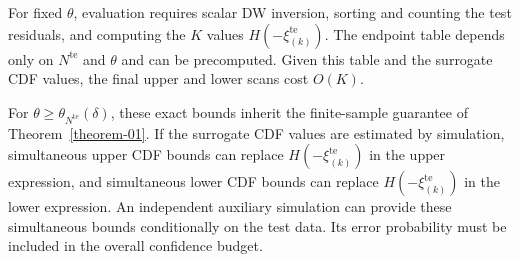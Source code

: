 \documentclass[review,11pt,3p,authoryear,nopreprintline]{elsarticle}
\begin{document}
For fixed $\theta$, evaluation requires scalar DW inversion, sorting and counting the test residuals, and computing the $K$ values $H\left(-\xi_{(k)}^{\mathrm{te}}\right)$. The endpoint table depends only on $N^{\mathrm{te}}$ and $\theta$ and can be precomputed. Given this table and the surrogate CDF values, the final upper and lower scans cost $O(K)$.

For $\theta\ge\theta_{N^{\mathrm{te}}}(\delta)$, these exact bounds inherit the finite-sample guarantee of Theorem~\ref{theorem-01}. If the surrogate CDF values are estimated by simulation, simultaneous upper CDF bounds can replace $H\left(-\xi_{(k)}^{\mathrm{te}}\right)$ in the upper expression, and simultaneous lower CDF bounds can replace $H\left(-\xi_{(k)}^{\mathrm{te}}\right)$ in the lower expression. An independent auxiliary simulation can provide these simultaneous bounds conditionally on the test data. Its error probability must be included in the overall confidence budget.
\end{document}
